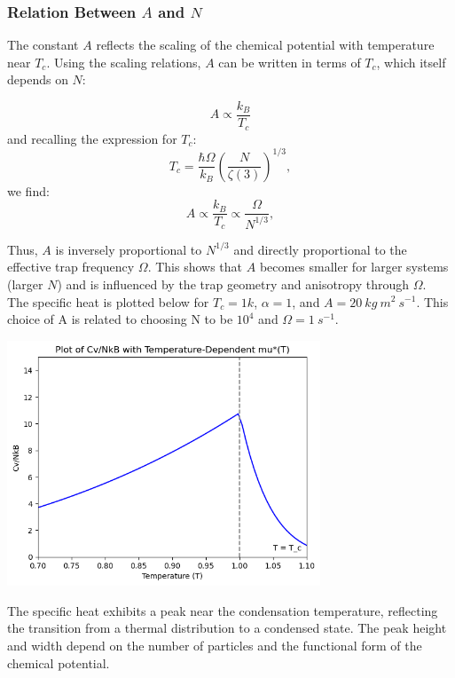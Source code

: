 \documentclass{article}
\numberwithin{equation}{section}
\numberwithin{equation}{subsection}
\begin{document}
\subsubsection{Relation Between \(A\) and \(N\)}

The constant \(A\) reflects the scaling of the chemical potential with temperature near \(T_c\). Using the scaling relations, \(A\) can be written in terms of \(T_c\), which itself depends on \(N\):

\[
A \propto \frac{k_B}{T_c}
\]
and recalling the expression for \(T_c\):
\[
T_c = \frac{\hbar\Omega}{k_B} \left( \frac{N}{\zeta(3)} \right)^{1/3},
\]
we find:
\[
A \propto \frac{k_B}{T_c}  \propto \frac{\Omega}{N^{1/3}},
\]

Thus, \(A\) is inversely proportional to \(N^{1/3}\) and directly proportional to the effective trap frequency \(\Omega\). This shows that \(A\) becomes smaller for larger systems (larger \(N\)) and is influenced by the trap geometry and anisotropy through \(\Omega\).\\


The specific heat is plotted below for  $T_c = 1k$, $\alpha = 1$, and $A = 20\ kg\ m^2\ s^{-1}$. This choice of A is related to choosing N to be $10^{4}$ and $\Omega = 1\ s^{-1}$. 
\begin{center}
    \includegraphics[width=0.7\textwidth]{output.png}
\end{center}
The specific heat exhibits a peak near the condensation temperature, reflecting the transition from a thermal distribution to a condensed state. The peak height and width depend on the number of particles and the functional form of the chemical potential.
\end{document}
